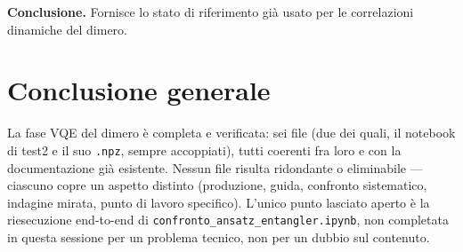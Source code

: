 \documentclass[11pt,a4paper]{article}
\begin{document}
\textbf{Conclusione.} Fornisce lo stato di riferimento già usato per le correlazioni
dinamiche del dimero.

\section*{Conclusione generale}

La fase VQE del dimero è completa e verificata: sei file (due dei quali, il
notebook di test2 e il suo \texttt{.npz}, sempre accoppiati), tutti coerenti fra
loro e con la documentazione già esistente. Nessun file risulta ridondante o
eliminabile — ciascuno copre un aspetto distinto (produzione, guida, confronto
sistematico, indagine mirata, punto di lavoro specifico). L'unico punto lasciato
aperto è la riesecuzione end-to-end di \texttt{confronto\_ansatz\_entangler.ipynb},
non completata in questa sessione per un problema tecnico, non per un dubbio sul
contenuto.
\end{document}
